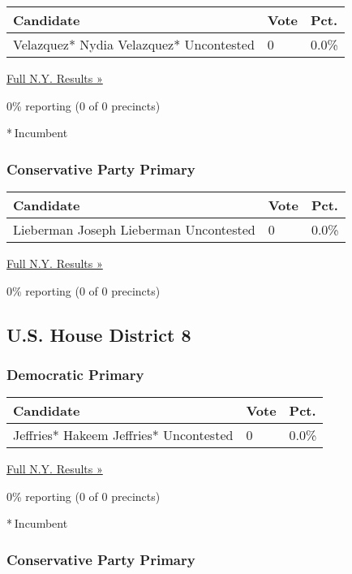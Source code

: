\begin{longtable}[]{@{}lll@{}}
\toprule
Candidate & Vote & Pct.\tabularnewline
\midrule
\endhead
 Velazquez* Nydia Velazquez* Uncontested & 0 & 0.0\%\tabularnewline
\bottomrule
\end{longtable}

\href{https://www.nytimes3xbfgragh.onion/elections/results/new-york}{Full
N.Y. Results »}

0\% reporting (0 of 0 precincts)

* Incumbent

\hypertarget{conservative-party-primary}{%
\subsubsection{Conservative Party
Primary}\label{conservative-party-primary}}

\begin{longtable}[]{@{}lll@{}}
\toprule
Candidate & Vote & Pct.\tabularnewline
\midrule
\endhead
 Lieberman Joseph Lieberman Uncontested & 0 & 0.0\%\tabularnewline
\bottomrule
\end{longtable}

\href{https://www.nytimes3xbfgragh.onion/elections/results/new-york}{Full
N.Y. Results »}

0\% reporting (0 of 0 precincts)

\hypertarget{us-house-district-8}{%
\subsection{U.S. House District 8}\label{us-house-district-8}}

\hypertarget{democratic-primary-8}{%
\subsubsection{Democratic Primary}\label{democratic-primary-8}}

\begin{longtable}[]{@{}lll@{}}
\toprule
Candidate & Vote & Pct.\tabularnewline
\midrule
\endhead
 Jeffries* Hakeem Jeffries* Uncontested & 0 & 0.0\%\tabularnewline
\bottomrule
\end{longtable}

\href{https://www.nytimes3xbfgragh.onion/elections/results/new-york}{Full
N.Y. Results »}

0\% reporting (0 of 0 precincts)

* Incumbent

\hypertarget{conservative-party-primary-1}{%
\subsubsection{Conservative Party
Primary}\label{conservative-party-primary-1}}

